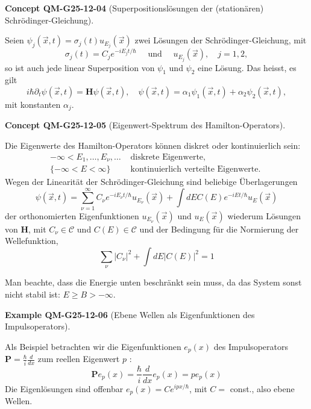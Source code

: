 \documentclass[10pt, letterpaper]{article}
\newcommand{\CustomHeading}[3]{%
  \par\medskip\noindent%
  \textbf{#1 #2} \textnormal{(#3)}.\enskip%
}
\newenvironment{EXA}[2]{\CustomHeading{Example}{#1}{#2}}{}
\newenvironment{CONC}[2]{\CustomHeading{Concept}{#1}{#2}}{}
\begin{document}
\begin{CONC}{QM-G25-12-04}{Superpositionslösungen der (stationären) Schrödinger-Gleichung}
Seien $\psi_{j}(\vec{x}, t)=\sigma_{j}(t) u_{E_{j}}(\vec{x})$ zwei Lösungen der Schrödinger-Gleichung, mit
$$
\sigma_{j}(t)=C_{j} e^{-i E_{j} t / \hbar} \quad \text { und } \quad u_{E_{j}}(\vec{x}), \quad j=1,2,
$$
so ist auch jede linear Superposition von $\psi_{1}$ und $\psi_{2}$ eine Lösung. Das heisst, es gilt
$$
i \hbar \partial_{t} \psi(\vec{x}, t)=\mathbf{H} \psi(\vec{x}, t), \quad \psi(\vec{x}, t)=\alpha_{1} \psi_{1}(\vec{x}, t)+\alpha_{2} \psi_{2}(\vec{x}, t),
$$
mit konstanten $\alpha_{j}$.
\end{CONC}

\begin{CONC}{QM-G25-12-05}{Eigenwert-Spektrum des Hamilton-Operators}
Die Eigenwerte des Hamilton-Operators können diskret oder kontinuierlich sein:
$$
\begin{aligned}
-\infty<E_{1}, \ldots, E_{\nu}, \ldots & \text { diskrete Eigenwerte, } \\
\{-\infty<E<\infty\} & \text { kontinuierlich verteilte Eigenwerte. }
\end{aligned}
$$
Wegen der Linearität der Schrödinger-Gleichung sind beliebige Überlagerungen
$$
\psi(\vec{x}, t)=\sum_{\nu=1}^{\infty} C_{\nu} e^{-i E_{\nu} t / \hbar} u_{E_{\nu}}(\vec{x})+\int d E C(E) e^{-i E t / \hbar} u_{E}(\vec{x})
$$
der orthonomierten Eigenfunktionen $u_{E_{\nu}}(\vec{x})$ und $u_{E}(\vec{x})$ wiederum Lösungen von $\mathbf{H}$, mit $C_{\nu} \in \mathcal{C}$ und $C(E) \in \mathcal{C}$ und der Bedingung für die Normierung der Wellefunktion,
$$
\sum_{\nu}\left|C_{\nu}\right|^{2}+\int d E|C(E)|^{2}=1
$$

Man beachte, dass die Energie unten beschränkt sein muss, da das System sonst nicht stabil ist: $E \geq B>-\infty$.
\end{CONC}

\begin{EXA}{QM-G25-12-06}{Ebene Wellen als Eigenfunktionen des Impulsoperators}
Als Beispiel betrachten wir die Eigenfunktionen $e_{p}(x)$ des Impulsoperators $\mathbf{P}=\frac{\hbar}{i} \frac{d}{d x}$ zum reellen Eigenwert $p$ :
$$
\mathbf{P} e_{p}(x)=\frac{\hbar}{i} \frac{d}{d x} e_{p}(x)=p e_{p}(x)
$$
Die Eigenlösungen sind offenbar $e_{p}(x)=C e^{i p x / \hbar}$, mit $C=$ const., also ebene Wellen.
\end{EXA}
\end{document}
